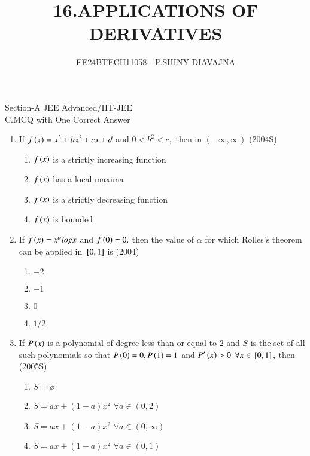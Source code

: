 \documentclass[journal,12pt,twocolumn]{IEEEtran}
\theoremstyle{remark}
\begin{document}

\vspace{3cm}

\title{16.APPLICATIONS OF DERIVATIVES}
\author{EE24BTECH11058 - P.SHINY DIAVAJNA}

\maketitle
\newpage
\bigskip


\renewcommand{\thefigure}{\theenumi}
\renewcommand{\thetable}{\theenumi}

  Section-A JEE Advanced/IIT-JEE\\
  
  C.MCQ with One Correct Answer\\ 
    \begin{enumerate} 
      \item
	  If $f\left(x\right)=x^3+bx^2+cx+d$ and $0<b^2<c,$ then in $(-\infty,\infty)$ \hfill(2004S)
        \begin{enumerate}
	 \item $f\left(x\right)$ is a strictly increasing function
	 \item $f\left(x\right)$ has a local maxima
	 \item $f\left(x\right)$ is a strictly decreasing function
	 \item $f\left(x\right)$ is bounded  \\
        \end{enumerate}
    
 
       \item
	       If $f\left(x\right)=x^{\alpha} logx$ and $f\left(0\right)=0,$ then the value of $\alpha$ for which Rolles's theorem can be applied in ${}\left[0,1\right]$ is 
		    \hfill(2004) 
        \begin {enumerate}
         \item $-2$
         \item $-1$
         \item $0$
         \item $1/2$\\
        \end{enumerate}
   
    
     \item
	     If $P\left(x\right)$ is a polynomial of degree less than or equal to $2$ and $S$ is the set of all such polynomials so that $P\left(0\right)=0,P\left(1\right)=1$ and $P^{\prime}\left(x\right)>0$ $\forall x \in {}\left[0,1\right],$ then
     \hfill(2005S)
    \begin{enumerate}
        \item  $S=\phi$
        \item  $S=ax+(1-a)x^2$ $\forall a \in (0,2)$
        \item  $S=ax+(1-a)x^2$ $\forall a\in (0,\infty)$
        \item  $S=ax+(1-a)x^2$ $\forall a \in (0,1)$ \\
    \end{enumerate} 
    

\end{enumerate}
\end{document}
